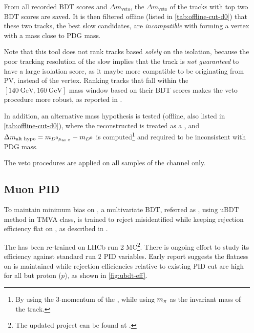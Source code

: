 From all recorded BDT scores and $\Delta m_\text{veto}$, the
$\Delta m_\text{veto}$ of the tracks with top two BDT scores are saved.
It is then filtered offline (listed in \cref{tab:offline-cut-d0})
that these two tracks,
the best slow \pion candidates,
are \emph{incompatible} with
forming a \Dz\pion vertex with a mass close to \Dstar PDG mass.

Note that this tool does not rank tracks based \emph{solely} on the isolation,
because the poor tracking resolution of the slow \pion implies that the track is
\emph{not guaranteed} to have a large isolation score, as it maybe more
compatible to be originating from PV, instead of the \B vertex.
Ranking tracks that fall within the $[140~\text{GeV}, 160~\text{GeV}]$
mass window based on their BDT scores
makes the veto procedure more robust, as reported in \cite{LHCb-ANA-2020-056}.

In addition, an alternative mass hypothesis is tested
(offline, also listed in \cref{tab:offline-cut-d0}), where the reconstructed
\muon is treated as a \pion,
and $\Delta m_\text{alt hypo} = m_{{{D}^0}{\mu}_\text{as {\ensuremath{\pi}}}} - m_{{D}^0}$
is computed\footnote{
    By using the 3-momentum of the \muon, while using $m_{\pi}$ as the invariant
    mass of the track.
} and required to be inconsistent with \Dstar PDG mass.

The veto procedures are applied on all samples of the \Dz channel only.


\subsection{Muon PID}
\label{ref:sel:tech:ubdt}

To maintain minimum bias on \muon \pt, a multivariate BDT,
referred as \UBDT, using uBDT method in TMVA class,
is trained to reject misidentified \muon while keeping rejection
efficiency flat on \pt,
as described in \cite{LHCb-ANA-2020-056}.

The \UBDT has been re-trained on LHCb run 2 MC\footnote{
    The updated project can be found at
    .
}.
There is ongoing effort to study its efficiency against standard run 2 PID
variables.
Early report suggests the flatness on \pt is maintained while rejection
efficiencies relative to existing PID cut are high for all but proton ($p$),
as shown in \cref{fig:ubdt-eff}.

